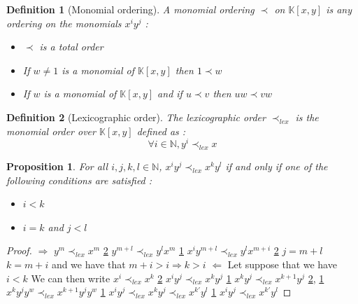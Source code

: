 \documentclass{article}
\newtheorem{definition}{Definition}[section]
\newtheorem{proposition}{Proposition}[section]
\begin{document}
\begin{definition}[Monomial ordering]\label{def:monomial-order}
    A monomial ordering $\prec$ on $\mathbb{K}[x, y]$ is any ordering on the monomials $x^{i}y^{j}$ : 
    \begin{itemize}
        \item $\prec$ is a total order
        \item If $w \neq 1$ is a monomial of $\mathbb{K}[x, y]$ then $1 \prec w$
        \item If $w$ is a monomial of $\mathbb{K}[x, y]$ and if $u \prec v$ then $uw \prec vw$
    \end{itemize}
\end{definition}

\begin{definition}[Lexicographic order]\label{def:lexicographic-order}
    The lexicographic order $\prec_{lex}$ is the monomial order over $\mathbb{K}[x, y]$ defined as : 
    \begin{displaymath}
        \forall i \in \mathbb{N}, y^{i} \prec_{lex} x
    \end{displaymath}
\end{definition}

\begin{proposition}
    For all $i, j, k, l \in \mathbb{N}$, $x^{i}y^{j} \prec_{lex} x^{k}y^{l}$ if and only if one of the following conditions are satisfied : 
    \begin{itemize}
        \item $i < k$
        \item $i = k$ and $j < l$
    \end{itemize}
\end{proposition}

\begin{proof}
    $\Rightarrow$ \newline
    $y^{m} \prec_{lex} x^{m}$ \ref{def:lexicographic-order} \newline
    $y^{m+l} \prec_{lex} y^{l}x^{m}$ \ref{def:monomial-order} \newline
    $x^{i}y^{m+l} \prec_{lex} y^{l}x^{m+i}$ \ref{def:lexicographic-order} \newline
    $j = m+l$ $ k = m + i$ and we have that $m+i>i \Rightarrow k > i$ \newline
    $\Leftarrow$ Let suppose that we have $i<k$ We can then write 
    \newline
    $x^{i}\prec_{lex} x^{k}$ \ref{def:lexicographic-order} \newline
    $x^{i}y^{j}\prec_{lex} 
    x^{k}y^{j}$ \ref{def:monomial-order}
    \newline
    $x^{k}y^{j} \prec_{lex} x^{k+1}y^{j} $ \ref{def:lexicographic-order}, \ref{def:monomial-order}
    \newline
    $x^{k}y^{j}y^{w} \prec_{lex} x^{k+1}y^{j}y^{w} $ \ref{def:monomial-order}
    \newline
    $x^{i}y^{j}\prec_{lex} 
    x^{k}y^{j}\prec_{lex} x^{k'}y^{l} $ \ref{def:monomial-order}
    \newline
    $x^{i}y^{j}\prec_{lex} x^{k'}y^{l} $
    
    
\end{proof}
\end{document}
